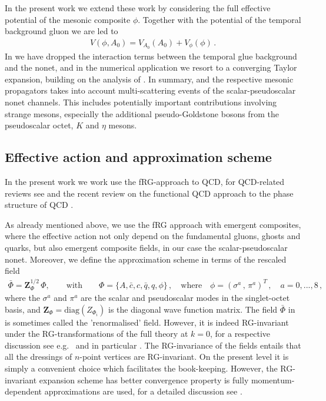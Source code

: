 \documentclass[reprint,twocolumn,superscriptaddress,preprintnumbers,amsmath,amssymb,aps,prd,floatfix]{revtex4-2}
\begin{document}
In the present work we extend these work by considering the full effective potential of the mesonic composite $\phi$. Together with the potential of the temporal background gluon we are led to 
%
\begin{align}
	V(\phi, A_0) = V_{A_0}(A_0) +V_\phi(\phi)\,. 
	\label{eq:FullPotential}
\end{align}
%
In  we have dropped the interaction terms between the temporal glue background and the nonet, and in the numerical application we resort to a converging Taylor expansion, building on the analysis of \cite{Ihssen:2024miv}. In summary,  and the respective mesonic propagators takes into account multi-scattering events of the scalar-pseudoscalar nonet channels. This includes potentially important contributions involving strange mesons, especially the additional pseudo-Goldstone bosons from the pseudoscalar octet, $K$ and $\eta$ mesons. 


\subsection{Effective action and approximation scheme}
\label{app:ApproxEffAct}

In the present work we work use the fRG-approach to QCD, for QCD-related reviews see \cite{Litim:1998nf, Berges:2000ew, Schaefer:2004en, Pawlowski:2005xe, Gies:2006wv, Braun:2011pp, Dupuis:2020fhh, Fu:2022gou} and the recent review on the functional QCD approach to the phase structure of QCD \cite{Fischer:2026uni}.  

As already mentioned above, we use the fRG approach with emergent composites, where the effective action not only depend on the fundamental gluons, ghosts and quarks, but also emergent composite fields, in our case the scalar-pseudoscalar nonet. Moreover, we define the approximation scheme in terms of the rescaled field
%
\begin{align}
    \bar \Phi=\boldsymbol{Z}_{\Phi}^{1/2}\,\Phi,\qquad\text{with} \qquad \Phi=\{A,\bar c, c, \bar q, q, \phi\}\,,\quad \textrm{where}\quad \phi=(\sigma^a\,,\,\pi^a)^T\,,\quad a=0,...,8\,, 
    \label{eq:ScaledPhi}
\end{align}
%
where the $\sigma^a$ and $\pi^a$ are the scalar and pseudoscalar modes in the singlet-octet basis, and $\boldsymbol{Z}_{\Phi}=\textrm{diag}(Z_{\Phi_i})$ is the diagonal wave function matrix. The field $\bar\Phi$ in  is sometimes called the 'renormalised' field. However, it is indeed RG-invariant under the RG-transformations of the full theory at $k=0$, for a respective discussion see e.g.~\cite{Pawlowski:2005xe, Dupuis:2020fhh} and in particular \cite{Ihssen:2024miv}. The RG-invariance of the fields entails that all the dressings of $n$-point vertices are RG-invariant. On the present level it is simply a convenient choice which facilitates the book-keeping. However, the RG-invariant expansion scheme has better convergence property is fully momentum-dependent approximations are used, for a detailed discussion see \cite{Ihssen:2024miv}.  
\end{document}

